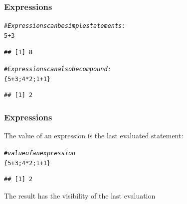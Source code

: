 \documentclass[12pt]{beamer}\usepackage[]{graphicx}\usepackage[]{color}
\makeatletter
\newcommand{\hlnum}[1]{\textcolor[rgb]{0.686,0.059,0.569}{#1}}%
\newcommand{\hlcom}[1]{\textcolor[rgb]{0.678,0.584,0.686}{\textit{#1}}}%
\newcommand{\hlopt}[1]{\textcolor[rgb]{0,0,0}{#1}}%
\newcommand{\hlstd}[1]{\textcolor[rgb]{0.345,0.345,0.345}{#1}}%
\newenvironment{kframe}{%
 \def\at@end@of@kframe{}%
 \ifinner\ifhmode%
  \def\at@end@of@kframe{\end{minipage}}%
  \begin{minipage}{\columnwidth}%
 \fi\fi%
 \def\FrameCommand##1{\hskip\@totalleftmargin \hskip-\fboxsep
 \colorbox{shadecolor}{##1}\hskip-\fboxsep
     \hskip-\linewidth \hskip-\@totalleftmargin \hskip\columnwidth}%
 \MakeFramed {\advance\hsize-\width
   \@totalleftmargin\z@ \linewidth\hsize
   \@setminipage}}%
 {\par\unskip\endMakeFramed%
 \at@end@of@kframe}
\newenvironment{knitrout}{}{} %
\makeatother
\begin{document}

\begin{frame}[fragile]
\frametitle{Expressions}

\begin{knitrout}\footnotesize
{}\color{fgcolor}\begin{kframe}
\begin{alltt}
\hlcom{# Expressions can be simple statements:}
\hlnum{5} \hlopt{+} \hlnum{3}
\end{alltt}
\begin{verbatim}
## [1] 8
\end{verbatim}
\end{kframe}
\end{knitrout}

\begin{knitrout}\footnotesize
{}\color{fgcolor}\begin{kframe}
\begin{alltt}
\hlcom{# Expressions can also be compound:}
\hlstd{\{}\hlnum{5} \hlopt{+} \hlnum{3}\hlstd{;} \hlnum{4} \hlopt{*} \hlnum{2}\hlstd{;} \hlnum{1} \hlopt{+} \hlnum{1}\hlstd{\}}
\end{alltt}
\begin{verbatim}
## [1] 2
\end{verbatim}
\end{kframe}
\end{knitrout}

\end{frame}


\begin{frame}[fragile]
\frametitle{Expressions}

The value of an expression is the last evaluated statement:
\begin{knitrout}\footnotesize
{}\color{fgcolor}\begin{kframe}
\begin{alltt}
\hlcom{# value of an expression}
\hlstd{\{}\hlnum{5} \hlopt{+} \hlnum{3}\hlstd{;} \hlnum{4} \hlopt{*} \hlnum{2}\hlstd{;} \hlnum{1} \hlopt{+} \hlnum{1}\hlstd{\}}
\end{alltt}
\begin{verbatim}
## [1] 2
\end{verbatim}
\end{kframe}
\end{knitrout}
The result has the visibility of the last evaluation

\end{frame}
\end{document}
